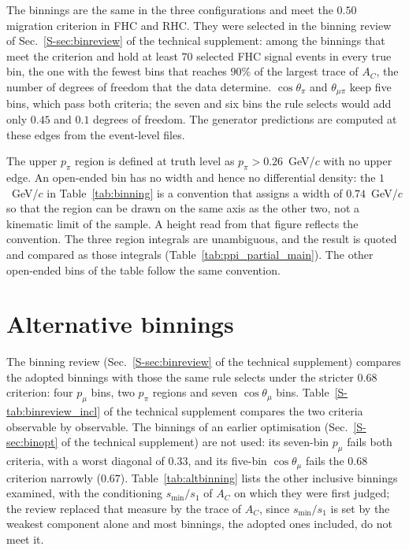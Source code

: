 \documentclass[11pt,a4paper]{article}
\newcommand{\suppref}[2]{#1~\ref{S-#2} of the technical supplement}
\begin{document}
 The binnings are the same in the three configurations and meet the $0.50$
migration criterion in FHC and RHC. They were selected in the binning review of
\suppref{Sec.}{sec:binreview}: among the binnings that meet the criterion and hold at least $70$
selected FHC signal events in every true bin, the one with the
fewest bins that reaches $90\%$ of the largest trace of $A_C$, the number of degrees of freedom that
the data determine. $\cos\theta_\pi$ and $\theta_{\mu\pi}$ keep five bins, which pass both
criteria; the seven and six bins the rule selects would add only $0.45$ and $0.1$ degrees of
freedom. The generator predictions are computed at these edges from the event-level files.



The upper $p_\pi$ region is defined at truth level as $p_\pi>0.26$~GeV/$c$ with no upper edge. An
open-ended bin has no width and hence no differential density: the $1$~GeV/$c$ in
Table~\ref{tab:binning} is a convention that assigns a width of $0.74$~GeV/$c$ so that the region can
be drawn on the same axis as the other two, not a kinematic limit of the sample. A height read from
that figure reflects the convention. The three region integrals are unambiguous, and the result is
quoted and compared as those integrals (Table~\ref{tab:ppi_partial_main}). The other open-ended bins
of the table follow the same convention.

\section{Alternative binnings}
\label{app:altbinning}

The binning review (\suppref{Sec.}{sec:binreview}) compares the adopted binnings with those the same
rule selects under the stricter $0.68$ criterion: four $p_\mu$ bins, two $p_\pi$ regions and seven
$\cos\theta_\mu$ bins. \suppref{Table}{tab:binreview_incl} compares the two criteria observable by observable. The binnings of an earlier
optimisation (\suppref{Sec.}{sec:binopt}) are not used: its seven-bin $p_\mu$ fails both criteria,
with a worst diagonal of $0.33$, and its five-bin $\cos\theta_\mu$ fails the $0.68$ criterion
narrowly ($0.67$). Table~\ref{tab:altbinning} lists the other inclusive binnings examined, with the
conditioning $s_{\min}/s_1$ of $A_C$ on which they were first judged; the review replaced that
measure by the trace of $A_C$, since $s_{\min}/s_1$ is set by the weakest component alone and most
binnings, the adopted ones included, do not meet it.
\end{document}
